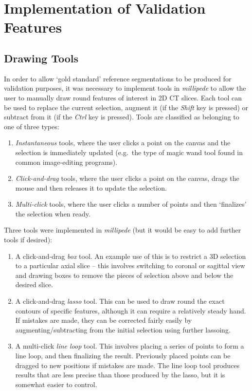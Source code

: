 \chapter{Implementation of Validation Features}
\label{chap:appendixval}

\section{Drawing Tools}

In order to allow `gold standard' reference segmentations to be produced for validation purposes, it was necessary to implement tools in \emph{millipede} to allow the user to manually draw round features of interest in 2D CT slices. Each tool can be used to replace the current selection, augment it (if the \emph{Shift} key is pressed) or subtract from it (if the \emph{Ctrl} key is pressed). Tools are classified as belonging to one of three types:
%
\begin{enumerate}
\item \emph{Instantaneous} tools, where the user clicks a point on the canvas and the selection is immediately updated (e.g.~the type of magic wand tool found in common image-editing programs).
\item \emph{Click-and-drag} tools, where the user clicks a point on the canvas, drags the mouse and then releases it to update the selection.
\item \emph{Multi-click} tools, where the user clicks a number of points and then `finalizes' the selection when ready.
\end{enumerate}
%
Three tools were implemented in \emph{millipede} (but it would be easy to add further tools if desired):
%
\begin{enumerate}

\item A click-and-drag \emph{box} tool. An example use of this is to restrict a 3D selection to a particular axial slice -- this involves switching to coronal or sagittal view and drawing boxes to remove the pieces of selection above and below the desired slice.

\item A click-and-drag \emph{lasso} tool. This can be used to draw round the exact contours of specific features, although it can require a relatively steady hand. If mistakes are made, they can be corrected fairly easily by augmenting/subtracting from the initial selection using further lassoing.

\item A multi-click \emph{line loop} tool. This involves placing a series of points to form a line loop, and then finalizing the result. Previously placed points can be dragged to new positions if mistakes are made. The line loop tool produces results that are less precise than those produced by the lasso, but it is somewhat easier to control.

\end{enumerate}
